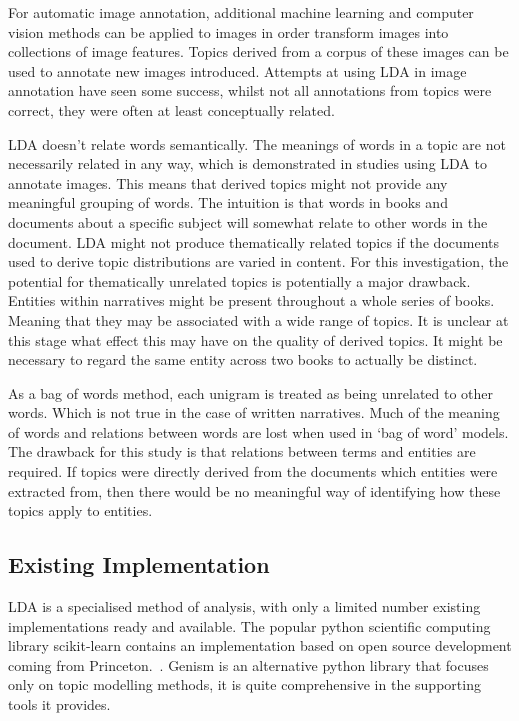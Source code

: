 \documentclass[10pt]{report}
\begin{document}
For automatic image annotation, additional machine learning and computer vision methods can be applied to images in order transform images into collections of image features. Topics derived from a corpus of these images can be used to annotate new images introduced. Attempts at using LDA in image annotation have seen some success, whilst not all annotations from topics were correct, they were often at least conceptually related.~\cite{Feng2010-dp, Zhang2011-dn}

LDA doesn’t relate words semantically. The meanings of words in a topic are not necessarily related in any way, which is demonstrated in studies using LDA to annotate images. This means that derived topics might not provide any meaningful grouping of words. The intuition is that words in books and documents about a specific subject will somewhat relate to other words in the document. LDA might not produce thematically related topics if the documents used to derive topic distributions are varied in content. For this investigation, the potential for thematically unrelated topics is potentially a major drawback. Entities within narratives might be present throughout a whole series of books. Meaning that they may be associated with a wide range of topics. It is unclear at this stage what effect this may have on the quality of derived topics. It might be necessary to regard the same entity across two books to actually be distinct.

As a bag of words method, each unigram is treated as being unrelated to other words. Which is not true in the case of written narratives. Much of the meaning of words and relations between words are lost when used in ‘bag of word’ models. The drawback for this study is that relations between terms and entities are required. If topics were directly derived from the documents which entities were extracted from, then there would be no meaningful way of identifying how these topics apply to entities.

\subsection{Existing Implementation}

LDA is a specialised method of analysis, with only a limited number existing implementations ready and available. The popular python scientific computing library scikit-learn contains an implementation based on open source development coming from Princeton.~\cite{scikit-learn, Hoffman_undated-nx}. Genism is an alternative python library that focuses only on topic modelling methods, it is quite comprehensive in the supporting tools it provides.~\cite{rehurek_lrec}
\end{document}
